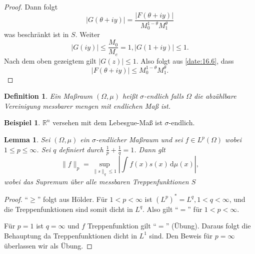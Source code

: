\documentclass[
paper=a4,
bibtotocnumbered,
liststotocnumbered,
tablecaptionabove,
pointlessnumbers,
twoside,
openright,
10pt
]
{report}
\newtheorem{lem}[thm]{Lemma}
\newtheorem{df}[thm]{Definition}
\theoremstyle{definition}
\newtheorem*{bsp}{Beispiel}
\numberwithin{equation}{chapter}
\begin{document}
\begin{proof}
Dann folgt
\begin{equation}\label{date:16.6}
|G(\theta+iy)| = \frac{|F(\theta + i y)|}{M_0^{1-\theta} M_1^\theta}
\end{equation}
was beschränkt ist in $S$. Weiter
\begin{equation}
|G(iy)|\le \frac{M_0}{M_e} = 1, |G(1+iy)|\le 1.
\end{equation}
Nach dem oben gezeigtem gilt $|G(z)|\le 1$. Also folgt aus \eqref{date:16.6}, dass
\begin{equation}
|F(\theta + iy)| \le M_0^{1-\theta} M_1^\theta.
\end{equation}
\end{proof}

\begin{df}
Ein Maßraum $(\Omega, \mu)$ heißt $\sigma$-endlich falls $\Omega$ die abzählbare Vereinigung messbarer mengen mit endlichen Maß ist.
\end{df}
\begin{bsp}
$\mathbb R^n$ versehen mit dem Lebesgue-Maß ist $\sigma$-endlich.
\end{bsp}

\begin{lem}\label{lm2}
Sei $(\Omega, \mu)$ ein $\sigma$-endlicher Maßraum und sei $f\in L^p(\Omega)$ wobei $1\le p \le \infty$.  Sei $q$ definiert durch $\frac{1}{p}+\frac{1}{q} =1$. Dann glt
\begin{equation}
\| f\|_p = \sup_{\| s\|_q \le 1} \left | \int f(x) s(x) \, \mathrm d\mu(x)\right |,
\end{equation}
wobei das Supremum über alle messbaren Treppenfunktionen $S$
\end{lem}
\begin{proof}
``$\ge$'' folgt aus Hölder. Für $1<p<\infty$ ist $(L^p)^*=L^q, 1 <q<\infty$, und die Treppenfunktionen sind somit dicht in $L^q$. Also gilt ``$=$'' für $1<p<\infty$.

Für $p=1$ ist $q=\infty$ und $f$ Treppenfunktion gilt ``$=$''  (Übung). Daraus folgt die Behauptung da Treppenfunktionen dicht in $L^1$ sind.  Den Beweis für $p=\infty$ überlassen wir als Übung.
\end{proof}
\end{document}
